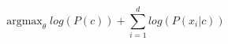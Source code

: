 \documentclass[UTF8]{ctexart}
\begin{document}
\begin{equation} \mathop{\arg\max}_{\theta}log(P(c))+\sum_{i=1}^{d}log(P(x_i|c)) \end{equation} 
\end{document}
